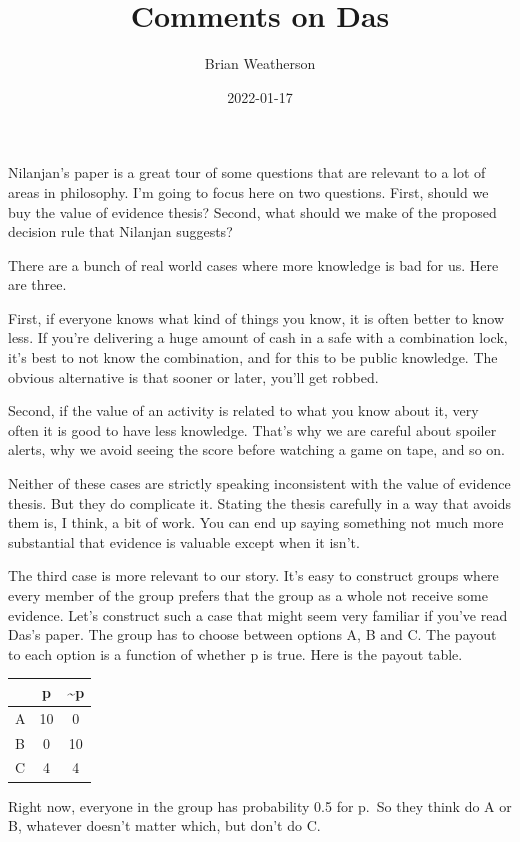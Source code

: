 \documentclass[
  12pt,
]{article}
\title{Comments on Das}
\author{Brian Weatherson}
\date{2022-01-17}
\begin{document}
\maketitle

Nilanjan's paper is a great tour of some questions that are relevant to
a lot of areas in philosophy. I'm going to focus here on two questions.
First, should we buy the value of evidence thesis? Second, what should
we make of the proposed decision rule that Nilanjan suggests?

There are a bunch of real world cases where more knowledge is bad for
us. Here are three.

First, if everyone knows what kind of things you know, it is often
better to know less. If you're delivering a huge amount of cash in a
safe with a combination lock, it's best to not know the combination, and
for this to be public knowledge. The obvious alternative is that sooner
or later, you'll get robbed.

Second, if the value of an activity is related to what you know about
it, very often it is good to have less knowledge. That's why we are
careful about spoiler alerts, why we avoid seeing the score before
watching a game on tape, and so on.

Neither of these cases are strictly speaking inconsistent with the value
of evidence thesis. But they do complicate it. Stating the thesis
carefully in a way that avoids them is, I think, a bit of work. You can
end up saying something not much more substantial that evidence is
valuable except when it isn't.

The third case is more relevant to our story. It's easy to construct
groups where every member of the group prefers that the group as a whole
not receive some evidence. Let's construct such a case that might seem
very familiar if you've read Das's paper. The group has to choose
between options A, B and C. The payout to each option is a function of
whether p is true. Here is the payout table.

\begin{longtable}[]{@{}lcc@{}}
\toprule
& p & \textasciitilde p \\
\midrule
\endhead
A & 10 & 0 \\
B & 0 & 10 \\
C & 4 & 4 \\
\bottomrule
\end{longtable}

Right now, everyone in the group has probability 0.5 for p.~So they
think do A or B, whatever doesn't matter which, but don't do C.
\end{document}
